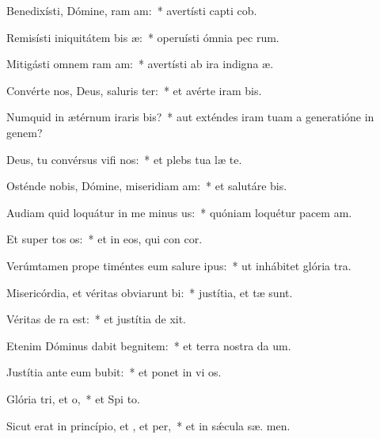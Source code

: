 \item Benedixísti, Dómine, ram am:~* avertísti capti cob.
\item Remisísti iniquitátem bis æ:~* operuísti ómnia pec rum.
\item Mitigásti omnem ram am:~* avertísti ab ira indigna æ.
\item Convérte nos, Deus, saluris ter:~* et avérte iram   bis.
\item Numquid in ætérnum iraris bis?~* aut exténdes iram tuam a generatióne in genem?
\item Deus, tu convérsus vifi nos:~* et plebs tua læ  te.
\item Osténde nobis, Dómine, miseridiam am:~* et salutáre   bis.
\item Audiam quid loquátur in me minus us:~* quóniam loquétur pacem   am.
\item Et super tos os:~* et in eos, qui con  cor.
\item Verúmtamen prope timéntes eum salure ipus:~* ut inhábitet glória   tra.
\item Misericórdia, et véritas obviarunt bi:~* justítia, et  tæ sunt.
\item Véritas de ra  est:~* et justítia de  xit.
\item Etenim Dóminus dabit begnitem:~* et terra nostra da  um.
\item Justítia ante eum bubit:~* et ponet in vi  os.
\item Glória tri, et o,~* et Spi to.
\item Sicut erat in princípio, et , et per,~* et in sǽcula sæ. men.
